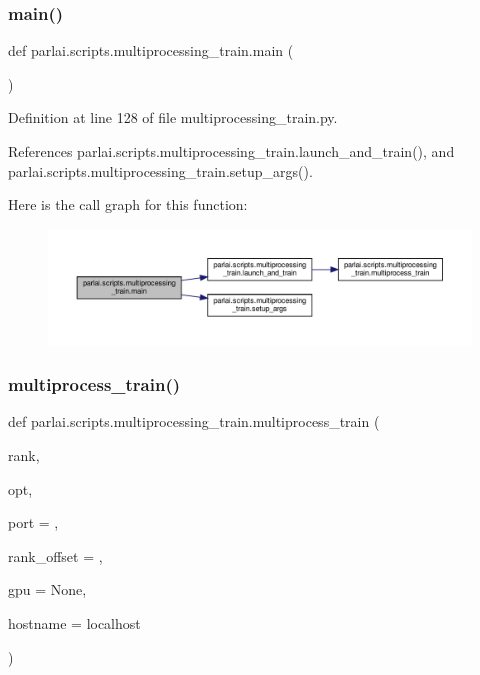 \subsubsection{\texorpdfstring{main()}{main()}}
{\footnotesize\ttfamily def parlai.\+scripts.\+multiprocessing\+\_\+train.\+main (\begin{DoxyParamCaption}{ }\end{DoxyParamCaption})}



Definition at line 128 of file multiprocessing\+\_\+train.\+py.



References parlai.\+scripts.\+multiprocessing\+\_\+train.\+launch\+\_\+and\+\_\+train(), and parlai.\+scripts.\+multiprocessing\+\_\+train.\+setup\+\_\+args().

Here is the call graph for this function\+:
\nopagebreak
\begin{figure}[H]
\begin{center}
\leavevmode
\includegraphics[width=350pt]{namespaceparlai_1_1scripts_1_1multiprocessing__train_aa7b2a133561ac5212f3ee9814a645522_cgraph}
\end{center}
\end{figure}
\mbox{\label{namespaceparlai_1_1scripts_1_1multiprocessing__train_aa979267c9eb44bbdfcd25a6d69a58cc4}} 
\subsubsection{\texorpdfstring{multiprocess\+\_\+train()}{multiprocess\_train()}}
{\footnotesize\ttfamily def parlai.\+scripts.\+multiprocessing\+\_\+train.\+multiprocess\+\_\+train (\begin{DoxyParamCaption}\item[{}]{rank,  }\item[{}]{opt,  }\item[{}]{port = {},  }\item[{}]{rank\+\_\+offset = {},  }\item[{}]{gpu = {\ttfamily None},  }\item[{}]{hostname = {\ttfamily \textquotesingle{}localhost\textquotesingle{}} }\end{DoxyParamCaption})}

